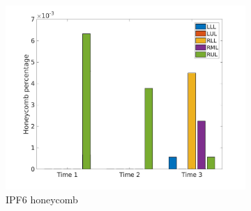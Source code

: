 \begin{figure}[H]
\begin{subfigure}{.46\linewidth}
  \includegraphics[width=\linewidth,trim={{.0\wd0} {.0\wd0} {.0\wd0} {.0\wd0}},clip]{Appendix/Image_AppexA/LobarDistribution/IPF6HoneycombLobarRegionDiseaseDistributionOverTime.jpg} %
  \caption{IPF6 honeycomb}
  \label{fig:IPF6LobarRegionDiseaseDistributionOverTime-c} 
\end{subfigure} 
\hspace{.3in}
\begin{subfigure}{.46\linewidth}%

\end{subfigure}
\end{figure}
